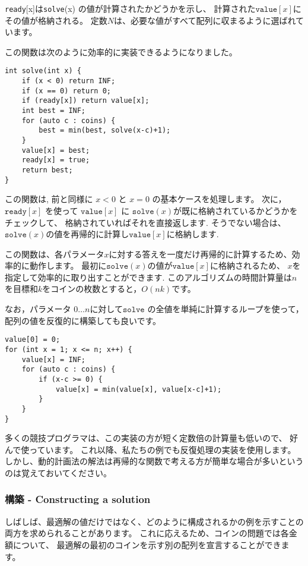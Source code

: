 \texttt{ready}[x]$は $\texttt{solve}(x) の値が計算されたかどうかを示し、
計算された$\texttt{value}[x]$にその値が格納される。
定数$N$は、必要な値がすべて配列に収まるように選ばれています。

この関数は次のように効率的に実装できるようになりました。
\begin{lstlisting}
int solve(int x) {
    if (x < 0) return INF;
    if (x == 0) return 0;
    if (ready[x]) return value[x];
    int best = INF;
    for (auto c : coins) {
        best = min(best, solve(x-c)+1);
    }
    value[x] = best;
    ready[x] = true;
    return best;
}
\end{lstlisting}

この関数は, 前と同様に $x < 0$ と $x = 0$ の基本ケースを処理します。
次に， $\texttt{ready}[x]$ を使って $\texttt{value}[x]$ に
$\texttt{solve}(x)$が既に格納されているかどうかをチェックして、
格納されていればそれを直接返します.
そうでない場合は、$\texttt{solve}(x)$の値を再帰的に計算し$\texttt{value}[x]$に格納します.

この関数は、各パラメータ$x$に対する答えを一度だけ再帰的に計算するため、効率的に動作します。
最初に$\texttt{solve}(x)$の値が$\texttt{value}[x]$に格納されるため、
$x$を指定して効率的に取り出すことができます.
このアルゴリズムの時間計算量は$n$を目標和$k$をコインの枚数とすると，$O(nk)$です。

なお，パラメータ $0 \ldots n$に対して$\texttt{solve}$ の全値を単純に計算するループを使って，
配列の値を反復的に構築しても良いです。
\begin{lstlisting}
value[0] = 0;
for (int x = 1; x <= n; x++) {
    value[x] = INF;
    for (auto c : coins) {
        if (x-c >= 0) {
            value[x] = min(value[x], value[x-c]+1);
        }
    }
}
\end{lstlisting}

多くの競技プログラマは、この実装の方が短く定数倍の計算量も低いので、
好んで使っています。
これ以降、私たちの例でも反復処理の実装を使用します。
しかし、動的計画法の解法は再帰的な関数で考える方が簡単な場合が多いというのは覚えておいてください。

\subsubsection{構築 - Constructing a solution}

しばしば、最適解の値だけではなく、どのように構成されるかの例を示すことの両方を求められることがあります。
これに応えるため、コインの問題では各金額について、
最適解の最初のコインを示す別の配列を宣言することができます。

